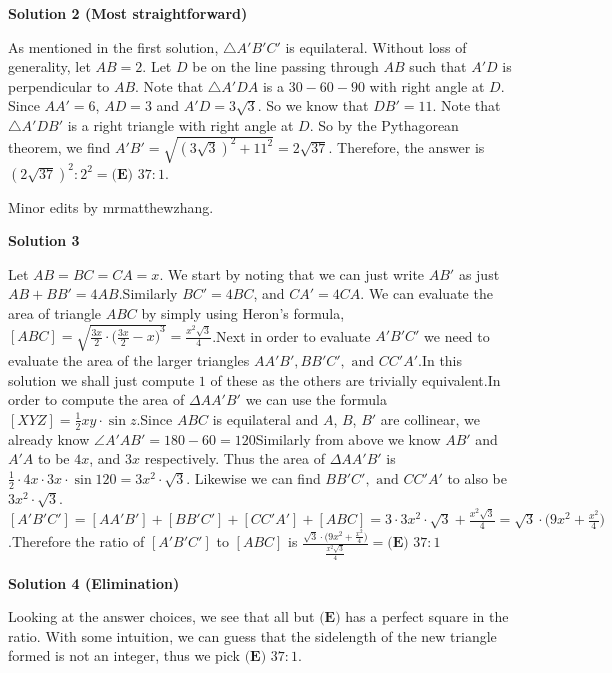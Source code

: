 \begin{enumerate}
\textbf{Solution 2 (Most straightforward)}

As mentioned in the first solution, $\triangle A'B'C'$ is equilateral. Without loss of generality, let $AB=2$. Let $D$ be on the line passing through $AB$ such that $A'D$ is perpendicular to $AB$. Note that $\triangle A'DA$ is a $30-60-90$ with right angle at $D$. Since $AA'=6$, $AD=3$ and $A'D=3\sqrt{3}$. So we know that $DB'=11$. Note that $\triangle A'DB'$ is a right triangle with right angle at $D$. So by the Pythagorean theorem, we find $A'B'= \sqrt{(3\sqrt{3})^2 + 11^2} = 2\sqrt{37}.$ Therefore, the answer is $(2\sqrt{37})^2 : 2^2 = \boxed{\textbf{(E) } 37:1}$.

 Minor edits by mrmatthewzhang.

 



\textbf{Solution 3}

Let $AB=BC=CA=x$. We start by noting that we can just write $AB'$ as just $AB+BB'=4AB$.Similarly $BC'=4BC$, and $CA'=4CA$. We can evaluate the area of triangle $ABC$ by simply using Heron's formula, $[ABC]=\sqrt{\frac{3x}{2}\cdot {\Bigg(\frac{3x}{2}-x\Bigg)}^3}=\frac{x^2\sqrt{3}}{4}$.Next in order to evaluate $A'B'C'$ we need to evaluate the area of the larger triangles $AA'B',BB'C', \text{ and } CC'A'$.In this solution we shall just compute $1$ of these as the others are trivially equivalent.In order to compute the area of $\Delta{AA'B'}$ we can use the formula $[XYZ]=\frac{1}{2}xy\cdot\sin{z}$.Since $ABC$ is equilateral and $A$, $B$, $B'$ are collinear, we already know $\angle{A'AB'}=180-60=120$Similarly from above we know $AB'$ and $A'A$ to be $4x$, and $3x$ respectively. Thus the area of $\Delta{AA'B'}$ is $\frac{1}{2}\cdot 4x\cdot 3x \cdot \sin{120}=3x^2\cdot\sqrt{3}$. Likewise we can find $BB'C', \text{ and } CC'A'$ to also be $3x^2\cdot\sqrt{3}$.$[A'B'C']=[AA'B']+[BB'C']+[CC'A']+[ABC]=3\cdot3x^2\cdot\sqrt{3}+\frac{x^2\sqrt{3}}{4}=\sqrt{3}\cdot\Bigg(9x^2+\frac{x^2}{4}\Bigg)$.Therefore the ratio of $[A'B'C']$ to $[ABC]$ is $\frac{\sqrt{3}\cdot\Bigg(9x^2+\frac{x^2}{4}\Bigg)}{\frac{x^2\sqrt{3}}{4}}=\boxed{\textbf{(E) } 37:1}$




\textbf{Solution 4 (Elimination)}

Looking at the answer choices, we see that all but ${\textbf{(E)}}$ has a perfect square in the ratio. With some intuition, we can guess that the sidelength of the new triangle formed is not an integer, thus we pick $\boxed{\textbf{(E) } 37:1}$.


\end{enumerate}
